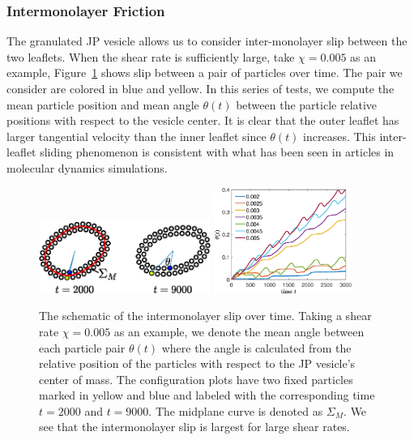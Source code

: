 \documentclass[lineno]{jfm}
\begin{document}
\subsubsection{Intermonolayer Friction}
The granulated JP vesicle allows us to consider inter-monolayer slip
between the two leaflets. When the shear rate is sufficiently large,
take $\chi = 0.005$ as an example, Figure~\ref{figure5} shows slip
between a pair of particles over time. The pair we consider are colored
in blue and yellow. In this series of tests, we compute the mean
particle position and mean angle $\theta(t)$ between the particle
relative positions with respect to the vesicle center. It is clear that
the outer leaflet has larger tangential velocity than the inner leaflet
since $\theta(t)$ increases. This inter-leaflet sliding phenomenon is
consistent with what has been seen in articles in molecular dynamics
simulations.


\begin{figure}
\begin{center}
\includegraphics[width=0.5\textwidth]{Slip.eps}
\includegraphics[width=0.4\textwidth]{Slip2.eps}
\end{center} 
  \caption{\label{figure5} The schematic of the intermonolayer slip over
  time. Taking a shear rate $\chi=0.005$ as an example, we denote the
  mean angle between each particle pair $\theta(t)$ where the angle is
  calculated from the relative position of the particles with respect to
  the JP vesicle's center of mass. The configuration plots have two
  fixed particles marked in yellow and blue and labeled with the
  corresponding time $t=2000$ and $t=9000$. The midplane curve is
  denoted as $\Sigma_M$. We see that the intermonolayer slip is largest
  for large shear rates.}
\end{figure}
\end{document}
